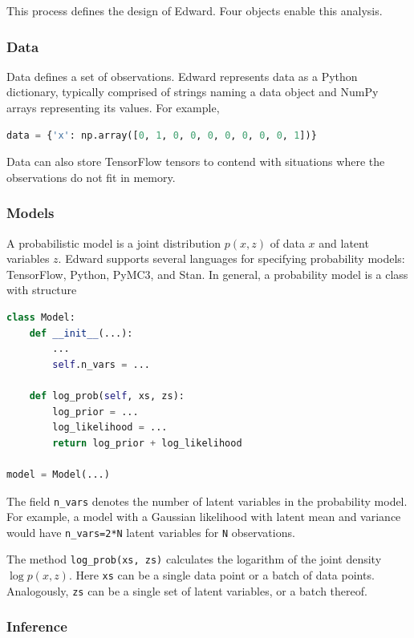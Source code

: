This process defines the design of Edward. Four objects enable this
analysis.

\subsubsection{Data}

Data defines a set of observations. Edward represents
data as a Python dictionary, typically comprised of strings naming a
data object and NumPy arrays representing its values. For example,

\begin{lstlisting}[language=Python]
data = {'x': np.array([0, 1, 0, 0, 0, 0, 0, 0, 0, 1])}
\end{lstlisting}

Data can also store TensorFlow tensors to contend with situations where the
observations do not fit in memory.

\subsubsection{Models}\label{models}

A probabilistic model is a joint distribution $p(x, z)$ of data $x$ and latent
variables $z$.
Edward supports several languages for specifying probability models:
TensorFlow, Python, PyMC3, and Stan. In general, a probability
model is a class with structure
\begin{lstlisting}[language=Python]
class Model:
    def __init__(...):
        ...
        self.n_vars = ...

    def log_prob(self, xs, zs):
        log_prior = ...
        log_likelihood = ...
        return log_prior + log_likelihood

model = Model(...)
\end{lstlisting}
The field \texttt{n\_vars} denotes the number of latent variables in the
probability model. For example, a model with a Gaussian likelihood with latent
mean and variance would have \texttt{n\_vars=2*N} latent variables for
\texttt{N} observations.

The method \texttt{log_prob(xs, zs)} calculates the logarithm of
the joint density $\log p(x,z)$. Here \texttt{xs} can be a single data
point or a batch of data points. Analogously, \texttt{zs} can be a
single set of latent variables, or a batch thereof.

\subsubsection{Inference}\label{inference}

